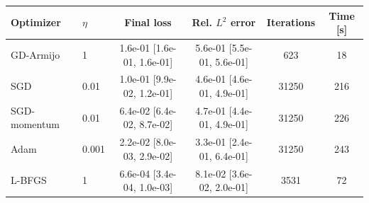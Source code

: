 \begin{tabular}{llcccc}
\toprule
Optimizer & $\eta$ & Final loss & Rel. $L^2$ error & Iterations & Time [s] \\
\midrule
GD-Armijo & 1 & 1.6e-01 [1.6e-01, 1.6e-01] & 5.6e-01 [5.5e-01, 5.6e-01] & 623 & 18 \\
SGD & 0.01 & 1.0e-01 [9.9e-02, 1.2e-01] & 4.6e-01 [4.6e-01, 4.9e-01] & 31250 & 216 \\
SGD-momentum & 0.01 & 6.4e-02 [6.4e-02, 8.7e-02] & 4.7e-01 [4.4e-01, 4.9e-01] & 31250 & 226 \\
Adam & 0.001 & 2.2e-02 [8.0e-03, 2.9e-02] & 3.3e-01 [2.4e-01, 6.4e-01] & 31250 & 243 \\
L-BFGS & 1 & 6.6e-04 [3.4e-04, 1.0e-03] & 8.1e-02 [3.6e-02, 2.0e-01] & 3531 & 72 \\
\bottomrule
\end{tabular}